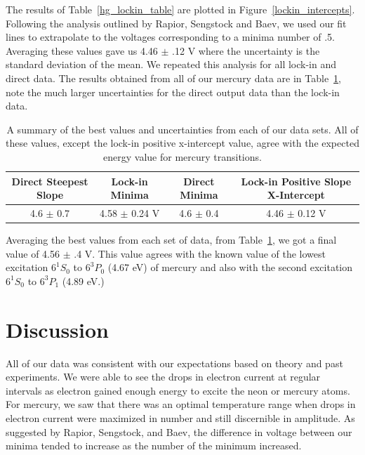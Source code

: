 \documentclass[prb,preprint]{revtex4-1}
\begin{document}
The results of Table~\ref{hg_lockin_table} are plotted in Figure~\ref{lockin_intercepts}. Following the analysis outlined by Rapior, Sengstock and Baev, we used our fit lines to extrapolate to the voltages corresponding to a minima number of .5. Averaging these values gave us 4.46 $\pm$ .12 V where the uncertainty is the standard deviation of the mean. We repeated this analysis for all lock-in and direct data. The results obtained from all of our mercury data are in Table~\ref{hg_results}, note the much larger uncertainties for the direct output data than the lock-in data.  


\begin{table}[h!]
\centering
\caption{A summary of the best values and uncertainties from each of our data sets. All of these values, except the lock-in positive x-intercept value, agree with the expected energy value for mercury transitions.}
\begin{ruledtabular}
\begin{tabular}{c c c c}
 Direct Steepest Slope & Lock-in Minima & Direct Minima & Lock-in Positive Slope X-Intercept   \\
\hline	%

 4.6 $\pm$ 0.7 & 4.58 $\pm$ 0.24 V & 4.6 $\pm$ 0.4 & 4.46 $\pm$ 0.12 V  \\

\end{tabular}
\end{ruledtabular}
\label{hg_results}
\end{table}

Averaging the best values from each set of data, from Table~\ref{hg_results}, we got a final value of 4.56 $\pm$ .4 V. This value agrees with the known value of the lowest excitation $6^{1}S_{0}$ to $6^{3}P_{0}$ (4.67 eV) of mercury and also with the second excitation $6^{1}S_{0}$ to $6^{3}P_{1}$ (4.89 eV.)~\cite{newfeatures}

\section{Discussion}

All of our data was consistent with our expectations based on theory and past experiments. We were able to see the drops in electron current at regular intervals as electron gained enough energy to excite the neon or mercury atoms. For mercury, we saw that there was an optimal temperature range when drops in electron current were maximized in number and still discernible in amplitude. As suggested by Rapior,  Sengstock, and Baev, the difference in voltage between our minima tended to increase as the number of the minimum increased. 
\end{document}
